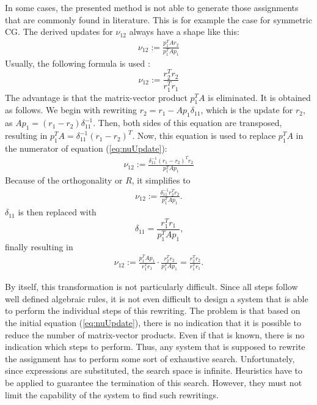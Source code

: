 In some cases, the presented method is not able to generate those assignments that are commonly found in literature. This is for example the case for symmetric CG. The derived updates for $\nu_{12}$ always have a shape like this:
%
\begin{align}
\nu_{12} :=  \frac{p_1^T A r_2}{p_1^T A p_1} \label{eq:nuUpdate}
\end{align}
%
Usually, the following formula is used \cite{barrett:templates, saad2000iterative, vanderVorst:book}:
%
$$\nu_{12} := \frac{r_2^T r_2}{r_1^T r_1}$$
%
The advantage is that the matrix-vector product $p_1^T A$ is eliminated. It is obtained as follows. We begin with rewriting $r_2 = r_1 - A p_1 \delta_{11}$, which is the update for $r_2$, as $A p_1 = (r_1 - r_2) \delta_{11}^{-1}$. Then, both sides of this equation are transposed, resulting in $p_1^T A = \delta_{11}^{-1} (r_1 - r_2)^T$. Now, this equation is used to replace $p_1^T A$ in the numerator of equation (\ref{eq:nuUpdate}):
%
\begin{align*}
\nu_{12} :=  \frac{\delta_{11}^{-1} (r_1 - r_2)^T r_2}{p_1^T A p_1}
\end{align*}
%
Because of the orthogonality or $R$, it simplifies to 
%
\begin{align*}
\nu_{12} :=  \frac{\delta_{11}^{-1} r_2^T r_2}{p_1^T A p_1} \text{.}
\end{align*}
%
$\delta_{11}$ is then replaced with
%
$$\delta_{11} = \frac{r_1^T r_1}{p_1^T A p_1} \text{,}$$
%
finally resulting in
%
\begin{align*}
\nu_{12} :=  \frac{p_1^T A p_1}{r_1^T r_1} \cdot \frac{r_2^T r_2}{p_1^T A p_1} = \frac{r_2^T r_2}{r_1^T r_1} \text{.}
\end{align*}
%

By itself, this transformation is not particularly difficult. Since all steps follow well defined algebraic rules, it is not even difficult to design a system that is able to perform the individual steps of this rewriting. The problem is that based on the initial equation (\ref{eq:nuUpdate}), there is no indication that it is possible to reduce the number of matrix-vector products. Even if that is known, there is no indication which steps to perform. Thus, any system that is supposed to rewrite the assignment has to perform some sort of exhaustive search. Unfortunately, since expressions are substituted, the search space is infinite. Heuristics have to be applied to guarantee the termination of this search. However, they must not limit the capability of the system to find such rewritings.

